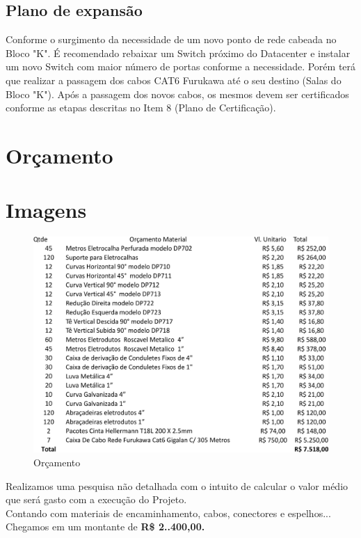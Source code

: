 \documentclass[	DIV=calc,%
paper=a4,%
fontsize=12pt,%
onecolumn]{scrartcl}	 					%
\begin{document}
	
	\subsection{Plano de expansão}
	
	Conforme o surgimento da necessidade de um novo ponto de rede cabeada no Bloco "K". É recomendado  rebaixar um Switch próximo do Datacenter e instalar um novo Switch com maior número de portas conforme a necessidade. Porém terá que realizar a passagem dos cabos CAT6 Furukawa até o seu destino (Salas do Bloco "K"). Após a passagem dos novos cabos, os mesmos devem ser certificados conforme as etapas descritas no Item 8 (Plano de Certificação).
	
	\section{Orçamento}
	
	\section{Imagens}
	\begin{figure}[!h]
		\caption{Orçamento}
		\includegraphics{orcamento}
	\end{figure}
	
	Realizamos uma pesquisa não detalhada com o intuito de calcular o valor médio que será gasto com a execução do Projeto.
	\\
	Contando com materiais de encaminhamento, cabos, conectores e espelhos...
	\\
	Chegamos em um montante de \textbf{R\$ 2..400,00.} 
	
\end{document}
